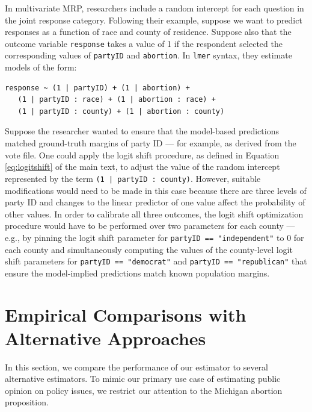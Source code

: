 In  multivariate MRP, researchers include a random intercept for each question in the joint response category. 
Following their example, suppose we want to predict responses as a function of race and county of residence.
Suppose also that the outcome variable \texttt{response} takes a value of 1 if the respondent selected the corresponding values of \texttt{partyID} and \texttt{abortion}. 
In \texttt{lmer} syntax, they estimate models of the form:
\begin{small}
\begin{lstlisting}
response ~ (1 | partyID) + (1 | abortion) + 
   (1 | partyID : race) + (1 | abortion : race) + 
   (1 | partyID : county) + (1 | abortion : county)
\end{lstlisting}
\end{small}
Suppose the researcher wanted to ensure that the model-based predictions matched ground-truth margins of party ID --- for example, as derived from the vote file.
One could apply the logit shift procedure, as defined in Equation \ref{eq:logitshift} of the main text, to adjust the value of the random intercept represented by the term \texttt{(1 | partyID : county)}.
However, suitable modifications would need to be made in this case because  there are three levels of party ID and changes to the linear predictor of one value affect the probability of other values. 
In order to calibrate all three outcomes, the logit shift optimization procedure would have to be performed over two parameters for each county --- e.g., by pinning the logit shift parameter for \texttt{partyID == "independent"} to 0 for each county and simultaneously computing the values of the county-level logit shift parameters for \texttt{partyID == "democrat"} and \texttt{partyID == "republican"}  that ensure the model-implied predictions match known population margins. 


\clearpage
\section{Empirical Comparisons with Alternative Approaches}
\label{apx:mrsp}

In this section, we compare the performance of our estimator to several alternative estimators. 
To mimic our primary use case of estimating public opinion on policy issues, we restrict our attention to the Michigan abortion proposition. 


